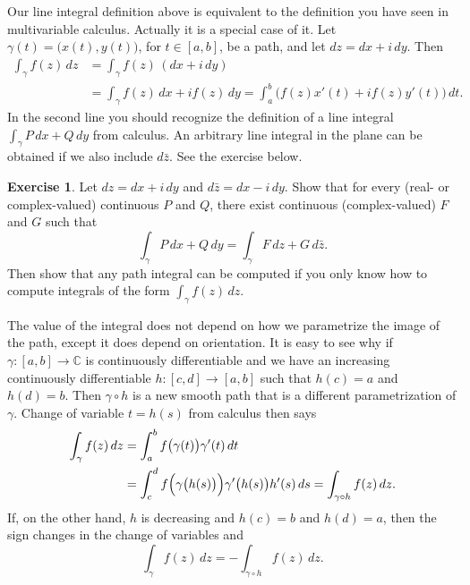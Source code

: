\documentclass[12pt,openany]{book}
\newcommand{\C}{{\mathbb{C}}}
\newcommand{\R}{{\mathbb{R}}}
\theoremstyle{plain}
\theoremstyle{remark}
\theoremstyle{definition}
\newenvironment{exbox}{%
    \def\FrameCommand{\vrule width 1pt \relax\hspace {10pt}}%
    \MakeFramed {\advance \hsize -\width \FrameRestore }%
}{%
    \endMakeFramed
}
\theoremstyle{exercise}
\newtheorem{exercise}{Exercise}[section]
\theoremstyle{example}
\begin{document}
Our line integral definition above is equivalent to the definition you
have seen in multivariable calculus.  Actually it is a special case of it.
Let $\gamma(t) = \bigl( x(t), y(t) \bigr)$, for $t \in [a,b]$, be a path,
and let $dz = dx + i\, dy$.
Then
\begin{equation*}
\begin{split}
\int_{\gamma} f(z) \, dz
& =
\int_{\gamma} f(z) \, (dx + i\, dy)
\\
& =
\int_{\gamma} f(z) \, dx + i f(z) \, dy
=
\int_a^b \bigl( f(z) x'(t) + i f(z) y'(t) \bigr) \, dt .
\end{split}
\end{equation*}
In the second line you should recognize the definition of a line integral
$\int_\gamma P\,dx + Q \, dy$ from calculus.  An arbitrary
line integral in the plane can be obtained if we also include $d\bar{z}$.  See the
exercise below.

\begin{exbox}
\begin{exercise} \label{exercise:realpathintegral}
Let $dz = dx + i \, dy$ and 
$d\bar{z} = dx - i \, dy$.  Show that for every (real- or complex-valued) continuous $P$ and $Q$,
there exist continuous (complex-valued) $F$ and $G$ such that
\begin{equation*}
\int_{\gamma} P \, dx + Q \, dy
=
\int_{\gamma} F \, dz + G \, d\bar{z} .
\end{equation*}
Then show that any path integral
can be computed if you only know how to compute integrals of the form $\int_\gamma f(z) \, dz$.
\end{exercise}
\end{exbox}

The value of the integral does not depend on how we parametrize the image of
the path, except it does depend on orientation.  It is easy to see why if
$\gamma \colon [a,b] \to \C$ is continuously differentiable and we have
an increasing continuously differentiable $h \colon [c,d] \to [a,b]$ such
that $h(c)=a$ and $h(d) = b$.  Then $\gamma \circ h$ is a new
smooth path that is a different parametrization of $\gamma$.
Change of variable $t=h(s)$ from calculus then says
\begin{equation*}
\begin{split}
\int_{\gamma} f(z) \, dz
& =
\int_a^b f\bigl( \gamma(t) \bigr) \gamma'(t) \, dt
\\
& =
\int_c^d f\Bigl( \gamma\bigl(h(s)\bigr) \Bigr) \gamma'\bigl(h(s)\bigr) h'(s) \, ds
=
\int_{\gamma \circ h} f(z) \, dz.
\end{split}
\end{equation*}
If, on the other hand, $h$ is decreasing and $h(c)=b$ and $h(d)=a$, then the
sign changes in the change of variables and
\begin{equation*}
\int_{\gamma} f(z) \, dz =
- \int_{\gamma \circ h} f(z) \, dz.
\end{equation*}
\end{document}

